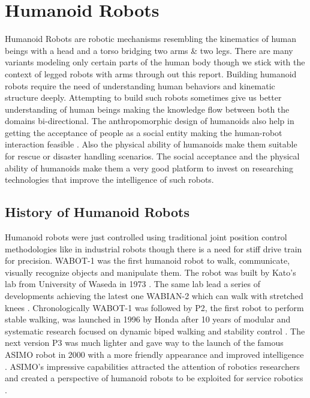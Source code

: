 
\section{Humanoid Robots}
Humanoid Robots are robotic mechanisms resembling the kinematics of human beings with a head and a torso bridging two arms \& two legs. There are many variants modeling only certain parts of the human body though we stick with the context of legged robots with arms through out this report. Building humanoid robots require the need of understanding human behaviors and kinematic structure deeply. Attempting to build such robots sometimes give us better understanding of human beings making the knowledge flow between both the domains bi-directional. The anthropomorphic design of humanoids also help in getting the acceptance of people as a social entity making the human-robot interaction feasible \cite{fink2012anthropomorphism}. Also the physical ability of humanoids make them suitable for rescue or disaster handling scenarios. The social acceptance and the physical ability of humanoids make them a very good platform to invest on researching technologies that improve the intelligence of such robots.

\subsection{History of Humanoid Robots}
Humanoid robots were just controlled using traditional joint position control methodologies like in industrial robots though there is a need for stiff drive train for precision. WABOT-1 was the first humanoid robot to walk, communicate, visually recognize objects and manipulate them. The robot was built by Kato's lab from University of Waseda in 1973 \cite{kato1973development}. The same lab lead a series of developments achieving the latest one WABIAN-2 which can walk with stretched knees \cite{ogura2006development}. Chronologically WABOT-1 was followed by P2, the first robot to perform stable walking, was launched in 1996 by Honda after 10 years of modular and systematic research focused on dynamic biped walking and stability control \cite{hirai1998development}. The next version P3  was much lighter and gave way to the launch of the famous ASIMO robot in 2000 with a more friendly appearance and improved intelligence \cite{hirose2007honda}. ASIMO's impressive capabilities attracted the attention of robotics researchers and created a perspective of humanoid robots to be exploited for service robotics \cite{kaneko2009cybernetic}. 



